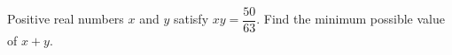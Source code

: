 Positive real numbers $x$ and $y$ satisfy $xy=\dfrac{50}{63}$. Find the minimum possible value of $x+y$.
